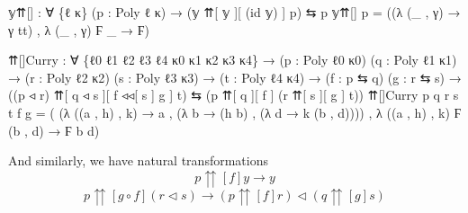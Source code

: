\documentclass[
  11pt,
  oneside,
  article]{memoir}
\newenvironment{Shaded}{}{}
\newcommand{\NormalTok}[1]{#1}
\newcommand{\OtherTok}[1]{\textcolor[rgb]{0.00,0.44,0.13}{#1}}
\theoremstyle{definition}
\theoremstyle{plain}
\newcommand{\0}{\textsf{0}}
\newcommand{\1}{\tn{\textsf{1}}}
\begin{document}
\begin{Shaded}
\begin{Highlighting}[]
\NormalTok{𝕪⇈[] }\OtherTok{:} \OtherTok{∀} \OtherTok{\{}\NormalTok{ℓ κ}\OtherTok{\}} \OtherTok{(}\NormalTok{p }\OtherTok{:}\NormalTok{ Poly ℓ κ}\OtherTok{)} \OtherTok{→} \OtherTok{(}\NormalTok{𝕪 ⇈[ 𝕪 ][ }\OtherTok{(}\NormalTok{id 𝕪}\OtherTok{)}\NormalTok{ ] p}\OtherTok{)}\NormalTok{ ⇆ p}
\NormalTok{𝕪⇈[] p }\OtherTok{=} \OtherTok{((λ} \OtherTok{(\_}\NormalTok{ , γ}\OtherTok{)} \OtherTok{→}\NormalTok{ γ tt}\OtherTok{)}\NormalTok{ , }\OtherTok{λ} \OtherTok{(\_}\NormalTok{ , γ}\OtherTok{)}\NormalTok{ Ϝ }\OtherTok{\_} \OtherTok{→}\NormalTok{ Ϝ}\OtherTok{)}

\NormalTok{⇈[]Curry }\OtherTok{:} \OtherTok{∀} \OtherTok{\{}\NormalTok{ℓ0 ℓ1 ℓ2 ℓ3 ℓ4 κ0 κ1 κ2 κ3 κ4}\OtherTok{\}}
           \OtherTok{→} \OtherTok{(}\NormalTok{p }\OtherTok{:}\NormalTok{ Poly ℓ0 κ0}\OtherTok{)} \OtherTok{(}\NormalTok{q }\OtherTok{:}\NormalTok{ Poly ℓ1 κ1}\OtherTok{)} 
           \OtherTok{→} \OtherTok{(}\NormalTok{r }\OtherTok{:}\NormalTok{ Poly ℓ2 κ2}\OtherTok{)} \OtherTok{(}\NormalTok{s }\OtherTok{:}\NormalTok{ Poly ℓ3 κ3}\OtherTok{)}
           \OtherTok{→} \OtherTok{(}\NormalTok{t }\OtherTok{:}\NormalTok{ Poly ℓ4 κ4}\OtherTok{)}
           \OtherTok{→} \OtherTok{(}\NormalTok{f }\OtherTok{:}\NormalTok{ p ⇆ q}\OtherTok{)} \OtherTok{(}\NormalTok{g }\OtherTok{:}\NormalTok{ r ⇆ s}\OtherTok{)}
           \OtherTok{→} \OtherTok{((}\NormalTok{p ◃ r}\OtherTok{)}\NormalTok{ ⇈[ q ◃ s ][ f ◃◃[ s ] g ] t}\OtherTok{)} 
\NormalTok{             ⇆ }\OtherTok{(}\NormalTok{p ⇈[ q ][ f ] }\OtherTok{(}\NormalTok{r ⇈[ s ][ g ] t}\OtherTok{))}
\NormalTok{⇈[]Curry p q r s t f g }\OtherTok{=} 
    \OtherTok{(} \OtherTok{(λ} \OtherTok{((}\NormalTok{a , h}\OtherTok{)}\NormalTok{ , k}\OtherTok{)} \OtherTok{→}\NormalTok{ a , }\OtherTok{(λ}\NormalTok{ b }\OtherTok{→} \OtherTok{(}\NormalTok{h b}\OtherTok{)}\NormalTok{ , }\OtherTok{(λ}\NormalTok{ d }\OtherTok{→}\NormalTok{ k }\OtherTok{(}\NormalTok{b , d}\OtherTok{))))} 
\NormalTok{    , }\OtherTok{λ} \OtherTok{((}\NormalTok{a , h}\OtherTok{)}\NormalTok{ , k}\OtherTok{)}\NormalTok{ Ϝ }\OtherTok{(}\NormalTok{b , d}\OtherTok{)} \OtherTok{→}\NormalTok{ Ϝ b d}\OtherTok{)}
\end{Highlighting}
\end{Shaded}

And similarly, we have natural transformations \[
p {\upuparrows}[f] y → y
\] \[
p {\upuparrows}[g \circ f] (r \triangleleft s) \to (p {\upuparrows}[f] r) \triangleleft (q {\upuparrows}[g] s)
\]
\end{document}
